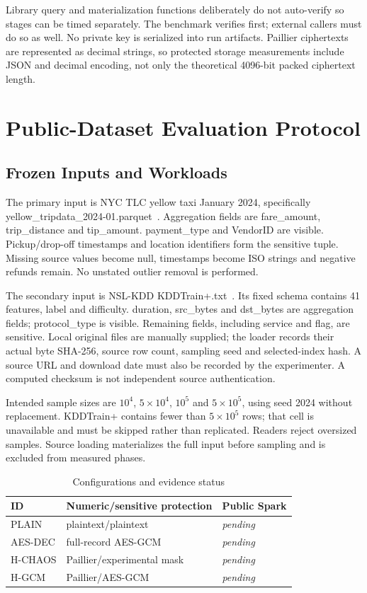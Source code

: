 \documentclass[conference]{IEEEtran}
\newcommand{\pending}{\textit{pending}}
\begin{document}
Library query and materialization functions deliberately do not auto-verify so stages can be timed separately. The benchmark verifies first; external callers must do so as well. No private key is serialized into run artifacts. Paillier ciphertexts are represented as decimal strings, so protected storage measurements include JSON and decimal encoding, not only the theoretical 4096-bit packed ciphertext length.

\section{Public-Dataset Evaluation Protocol}
\subsection{Frozen Inputs and Workloads}
The primary input is NYC TLC yellow taxi January 2024, specifically yellow\_tripdata\_2024-01.parquet~\cite{tlc}. Aggregation fields are fare\_amount, trip\_distance and tip\_amount. payment\_type and VendorID are visible. Pickup/drop-off timestamps and location identifiers form the sensitive tuple. Missing source values become null, timestamps become ISO strings and negative refunds remain. No unstated outlier removal is performed.

The secondary input is NSL-KDD KDDTrain+.txt~\cite{nsl}. Its fixed schema contains 41 features, label and difficulty. duration, src\_bytes and dst\_bytes are aggregation fields; protocol\_type is visible. Remaining fields, including service and flag, are sensitive. Local original files are manually supplied; the loader records their actual byte SHA-256, source row count, sampling seed and selected-index hash. A source URL and download date must also be recorded by the experimenter. A computed checksum is not independent source authentication.

Intended sample sizes are $10^4$, $5\times10^4$, $10^5$ and $5\times10^5$, using seed 2024 without replacement. KDDTrain+ contains fewer than $5\times10^5$ rows; that cell is unavailable and must be skipped rather than replicated. Readers reject oversized samples. Source loading materializes the full input before sampling and is excluded from measured phases.

\begin{table}[t]
\centering\caption{Configurations and evidence status}
\begin{tabular}{lll}\toprule
ID & Numeric/sensitive protection & Public Spark\\\midrule
PLAIN & plaintext/plaintext & \pending\\
AES-DEC & full-record AES-GCM & \pending\\
H-CHAOS & Paillier/experimental mask & \pending\\
H-GCM & Paillier/AES-GCM & \pending\\\bottomrule
\end{tabular}
\end{table}
\end{document}
